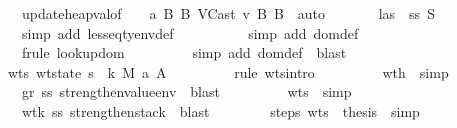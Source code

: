 \begin{isabellebody}
\ \ \ \ \ \ \ \ \isamarkupfalse \ update{\isacharunderscore}heap{\isacharunderscore}val{\isacharbrackleft}of\ {\isasymSigma}\ {\isasymmu}\ {\isachardoublequoteopen}{\isacharbraceleft}{\isacharbraceright}{\isachardoublequoteclose}\ a\ B{\isacharprime}\ B{\isacharprime}\ {\isachardoublequoteopen}VCast\ v{}\ B\ B{\isacharprime}{\isachardoublequoteclose}{\isacharbrackright}\ \isamarkupfalse \ auto\isanewline
\ \ \ \ \ \ \isamarkupfalse \ las\ \isamarkupfalse \ ss{\isacharcolon}\ {\isachardoublequoteopen}{\isacharquery}S{}\ {\isasymsqsubseteq}\ {\isasymSigma}{\isachardoublequoteclose}\isanewline
\ \ \ \ \ \ \ \ \isamarkupfalse \ {\isacharparenleft}simp\ add{\isacharcolon}\ lesseq{\isacharunderscore}tyenv{\isacharunderscore}def{\isacharparenright}\ \isanewline
\ \ \ \ \ \ \ \ \isamarkupfalse \ {\isacharparenleft}simp\ add{\isacharcolon}\ dom{\isacharunderscore}def{\isacharparenright}\isanewline
\ \ \ \ \ \ \ \ \isamarkupfalse \ {\isacharparenleft}frule\ lookup{\isacharunderscore}dom{\isacharparenright}\isanewline
\ \ \ \ \ \ \ \ \isamarkupfalse \ {\isacharparenleft}simp\ add{\isacharcolon}\ dom{\isacharunderscore}def{\isacharparenright}\ \isamarkupfalse \ blast\ \isamarkupfalse \isanewline
\ \ \ \ \ \ \isamarkupfalse \ wt{\isacharunderscore}s{\isacharcolon}\ {\isachardoublequoteopen}wt{\isacharunderscore}state\ {\isacharparenleft}s{\isacharprime}{\isacharcomma}\ {\isasymrho}{\isacharcomma}\ k{\isacharcomma}\ {\isacharquery}M{}{\isacharcomma}\ {\isacharbrackleft}a{\isacharbrackright}{\isacharparenright}\ A{\isachardoublequoteclose}\isanewline
\ \ \ \ \ \ \ \ \isamarkupfalse \ {\isacharparenleft}rule\ wts{\isacharunderscore}intro{\isacharparenright}\isanewline
\ \ \ \ \ \ \ \ \isamarkupfalse \ wt{\isacharunderscore}h{}\ \isamarkupfalse \ simp\isanewline
\ \ \ \ \ \ \ \ \isamarkupfalse \ gr\ ss\ strengthen{\isacharunderscore}value{\isacharunderscore}env\ \isamarkupfalse \ blast\isanewline
\ \ \ \ \ \ \ \ \isamarkupfalse \ wts{}\ \isamarkupfalse \ simp\isanewline
\ \ \ \ \ \ \ \ \isamarkupfalse \ wt{\isacharunderscore}k\ ss\ strengthen{\isacharunderscore}stack\ \isamarkupfalse \ blast\ \isamarkupfalse \isanewline
\ \ \ \ \ \ \isamarkupfalse \ steps\ wt{\isacharunderscore}s\ \isamarkupfalse \ {\isacharquery}thesis\ \isamarkupfalse \ simp\isanewline

\end{isabellebody}
